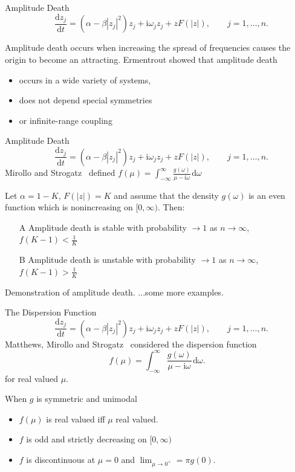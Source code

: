 \documentclass[10pt,reqno]{beamer}
\newcommand{\D}[2]{\frac{\mathrm{d} #1}{\mathrm{d} #2}}
\newcommand{\I}{\mathrm{i}}
\newcommand{\df}[1]{\mspace{2mu}  \mathrm{d}#1}
\begin{document}
\begin{frame}{Amplitude Death}
\[
\quad \D{z_j}{t} = (\alpha - \beta|z_j|^2)z_j + \I\omega_jz_j +zF(|z|), \qquad j = 1,\ldots, n.
\]

Amplitude death occurs when increasing the spread of frequencies causes the origin to become an attracting.
\vfill
Ermentrout\cite{Ermentrout90} showed that amplitude death 
\begin{itemize}
\item occurs in a wide variety of systems, 
\item does not depend special symmetries 
\item or infinite-range coupling
\end{itemize}
\end{frame}
\begin{frame}{Amplitude Death}
\[
\quad \D{z_j}{t} = (\alpha - \beta|z_j|^2)z_j + \I\omega_jz_j +zF(|z|), \qquad j = 1,\ldots, n.
\]
Mirollo and Strogatz~\cite{Mirollo90} defined
$f(\mu) = \int_{-\infty}^\infty \frac{g(\omega)}{\mu - \I\omega}\df{\omega}$
\begin{tcolorbox}[notitle, boxrule=0pt, colback=lred]
\begin{theorem}
Let $\alpha = 1-K$, $F(|z|)=K$ and assume that the density $g(\omega)$ is an even function which is nonincreasing on $[0,\infty)$.
Then: 
\begin{itemize}
\item[A] Amplitude death is stable with 
probability $\rightarrow 1$ as $n \rightarrow \infty$, $f(K-1) < \frac{1}{K}$
\item[B] Amplitude death is unstable with 
probability $\rightarrow 1$ as $n \rightarrow \infty$, $f(K-1) > \frac{1}{K}$
\end{itemize}
\end{theorem}
\end{tcolorbox}
\end{frame}
\begin{frame}{Demonstration of amplitude death.}
\centering
\vfill
...some more examples.
\end{frame}
\begin{frame}{The Dispersion Function}
\[
\quad \D{z_j}{t} = (\alpha - \beta|z_j|^2)z_j + \I\omega_jz_j +zF(|z|), \qquad j = 1,\ldots, n.
\]
Matthews, Mirollo and Strogatz~\cite{Matthews91} considered the dispersion function
\[f(\mu) = \int_{-\infty}^\infty \frac{g(\omega)}{\mu - \I\omega}\df{\omega}.\]
for real valued $\mu$.

When $g$ is symmetric and unimodal
\begin{itemize}
\item $f(\mu)$ is real valued iff $\mu$ real valued.
\item $f$ is odd and strictly decreasing on $[0,\infty)$
\item $f$ is discontinuous at $\mu=0$ and $\lim_{\mu\rightarrow 0^+} = \pi g(0)$.
\end{itemize}
\end{frame}
\end{document}
